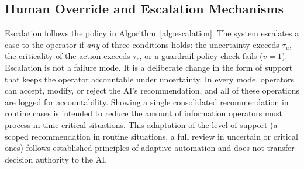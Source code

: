 \documentclass[journal]{IEEEtran}
\theoremstyle{plain}
\theoremstyle{definition}
\begin{document}
\subsection{Human Override and Escalation Mechanisms}
Escalation follows the policy in Algorithm~\ref{alg:escalation}. The system escalates a case to the operator if \emph{any} of three conditions holds: the uncertainty exceeds $\tau_u$, the criticality of the action exceeds $\tau_c$, or a guardrail policy check fails ($v=1$). Escalation is not a failure mode. It is a deliberate change in the form of support that keeps the operator accountable under uncertainty.
In every mode, operators can accept, modify, or reject the AI's recommendation, and all of these operations are logged for accountability. Showing a single consolidated recommendation in routine cases is intended to reduce the amount of information operators must process in time-critical situations.
This adaptation of the level of support (a scoped recommendation in routine situations, a full review in uncertain or critical ones) follows established principles of adaptive automation \cite{Parasuraman2000LOA,Scerbo2007} and does not transfer decision authority to the AI.
\end{document}
